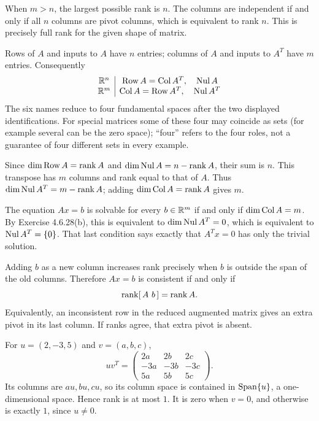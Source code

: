 When $m>n$, the largest possible rank is $n$. The columns are independent
if and only if all $n$ columns are pivot columns, which is equivalent to
rank $n$. This is precisely full rank for the given shape of matrix.

Rows of $A$ and inputs to $A$ have $n$ entries; columns of $A$ and inputs
to $A^T$ have $m$ entries. Consequently
\[
 \begin{array}{c|c}
 \mathbb{R}^n&\operatorname{Row}A=\operatorname{Col} A^T,\quad\operatorname{Nul} A\\
 \mathbb{R}^m&\operatorname{Col} A=\operatorname{Row}A^T,\quad\operatorname{Nul} A^T
 \end{array}
\]
The six names reduce to four fundamental spaces after the two displayed
identifications. For special matrices some of these four may coincide as
sets (for example several can be the zero space); ``four'' refers to the
four roles, not a guarantee of four different sets in every example.

Since $\dim\operatorname{Row}A=\operatorname{rank} A$ and
$\dim\operatorname{Nul} A=n-\operatorname{rank} A$, their sum is $n$.
This transpose has $m$ columns and rank equal to that of $A$.
Thus $\dim\operatorname{Nul} A^T=m-\operatorname{rank} A$; adding $\dim\operatorname{Col} A=\operatorname{rank} A$ gives $m$.

The equation $Ax=b$ is solvable for every $b\in\mathbb{R}^m$ if and only if
$\dim\operatorname{Col} A=m$. By Exercise 4.6.28(b), this is equivalent to
$\dim\operatorname{Nul} A^T=0$, which is equivalent to $\operatorname{Nul} A^T=\{0\}$.
That last condition says exactly that $A^Tx=0$ has only the trivial solution.

Adding $b$ as a new column increases rank precisely when $b$ is outside
the span of the old columns. Therefore $Ax=b$ is consistent if and only if
\[
 \rank[\,A\ b\,]=\rank A.
\]
Equivalently, an inconsistent row in the reduced augmented matrix gives an
extra pivot in its last column. If ranks agree, that extra pivot is absent.

For $u=(2,-3,5)$ and $v=(a,b,c)$,
\[
 uv^T=\begin{pmatrix}2a&2b&2c\\-3a&-3b&-3c\\5a&5b&5c\end{pmatrix}.
\]
Its columns are $au,bu,cu$, so its column space is contained in
$\operatorname{Span}\{u\}$, a one-dimensional space. Hence rank is at most $1$.
It is zero when $v=0$, and otherwise is exactly $1$, since $u\ne0$.

